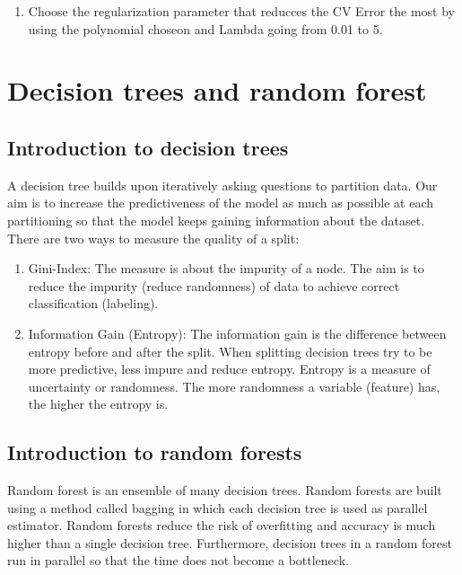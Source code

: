 \documentclass{article}
\begin{document}
\begin{enumerate}

\item Choose the regularization parameter that reducces the CV Error the most by using the polynomial choseon and Lambda going from 0.01 to 5.
\end{enumerate}



\section{Decision trees and random forest}
\subsection{Introduction to decision trees}
A decision tree builds upon iteratively asking questions to partition data.
Our aim is to increase the predictiveness of the model as much as possible at each partitioning so that the model keeps gaining information about the dataset.
There are two ways to measure the quality of a split:
\begin{enumerate}
	\item Gini-Index: The measure is about the impurity of a node. The aim is to reduce the impurity (reduce randomness) of data to achieve correct classification (labeling).
	\item Information Gain (Entropy):
	The information gain is the difference between entropy before and after the split.
	When splitting decision trees try to be more predictive, less impure and reduce entropy. Entropy is a measure of uncertainty or randomness. The more randomness a variable (feature) has, the higher the entropy is.  
\end{enumerate}

\subsection{Introduction to random forests}
Random forest is an ensemble of many decision trees. Random forests are built using a method called bagging in which each decision tree is used as parallel estimator.
Random forests reduce the risk of overfitting and accuracy is much higher than a single decision tree. Furthermore, decision trees in a random forest run in parallel so that the time does not become a bottleneck.
\end{document}

